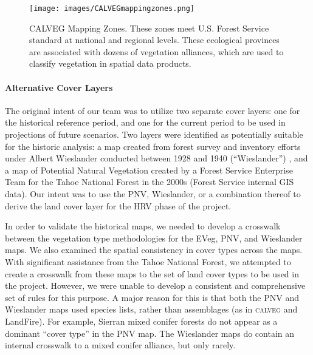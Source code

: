 \begin{wrapfigure}{R}{0.5\textwidth} %
\texttt{[image: images/CALVEGmappingzones.png]}
\caption{\small CALVEG Mapping Zones. These zones meet U.S. Forest Service standard at national and regional levels. These ecological provinces are associated with dozens of vegetation alliances, which are used to classify vegetation in spatial data products.} 
\label{calveg}
\end{wrapfigure}

\paragraph{Alternative Cover Layers}
The original intent of our team was to utilize two separate cover layers: one for the historical reference period, and one for the current period to be used in projections of future scenarios. Two layers were identified as potentially suitable for the historic analysis: a map created from forest survey and inventory efforts under Albert Wieslander conducted between 1928 and 1940 (``Wieslander'') \citep{Thorne2006}, and a map of Potential Natural Vegetation created by a Forest Service Enterprise Team for the Tahoe National Forest in the 2000s (Forest Service internal GIS data). Our intent was to use the PNV, Wieslander, or a combination thereof to derive the land cover layer for the HRV phase of the project. 

In order to validate the historical maps, we needed to develop a crosswalk between the vegetation type methodologies for the EVeg, PNV, and Wieslander maps. We also examined the spatial consistency in cover types across the maps. With significant assistance from the Tahoe National Forest, we attempted to create a crosswalk from these maps to the set of land cover types to be used in the project. However, we were unable to develop a consistent and comprehensive set of rules for this purpose. A major reason for this is that both the PNV and Wieslander maps used species lists, rather than assemblages (as in \textsc{calveg} and LandFire). For example, Sierran mixed conifer forests do not appear as a dominant ``cover type'' in the PNV map. The Wieslander maps do contain an internal crosswalk to a mixed conifer alliance, but only rarely. 

